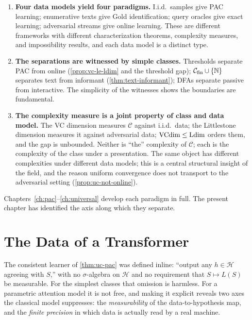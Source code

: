 \begin{enumerate}[leftmargin=*,itemsep=3pt]
\item \textbf{Four data models yield four paradigms.} I.i.d.\ samples give PAC learning; enumerative texts give Gold identification; query oracles give exact learning; adversarial streams give online learning. These are different frameworks with different characterization theorems, complexity measures, and impossibility results, and each data model is a distinct type.

\item \textbf{The separations are witnessed by simple classes.} Thresholds separate PAC from online (\cref{prop:vc-le-ldim} and the threshold gap); $\mathcal{C}_{\mathrm{fin}} \cup \{\mathbb{N}\}$ separates text from informant (\cref{thm:text-informant}); DFAs separate passive from interactive. The simplicity of the witnesses shows the boundaries are fundamental.

\item \textbf{The complexity measure is a joint property of class and data model.} The VC dimension measures $\mathcal{C}$ against i.i.d.\ data; the Littlestone dimension measures it against adversarial data; $\mathrm{VCdim} \leq \mathrm{Ldim}$ orders them, and the gap is unbounded. Neither is ``the'' complexity of $\mathcal{C}$; each is the complexity of the class under a presentation. The same object has different complexities under different data models; this is a central structural insight of the field, and the reason uniform convergence does not transport to the adversarial setting (\cref{prop:uc-not-online}).
\end{enumerate}

Chapters~\ref{ch:pac}--\ref{ch:universal} develop each paradigm in full. The present chapter has identified the axis along which they separate.


\section{The Data of a Transformer}
\label{sec:ch2-transformer}

The consistent learner of \cref{thm:uc-pac} was defined inline: ``output any $h \in \mathcal{H}$ agreeing with $S$,'' with no $\sigma$-algebra on $\mathcal{H}$ and no requirement that $S \mapsto L(S)$ be measurable. For the simplest classes that omission is harmless. For a parametric attention model it is not free, and making it explicit reveals two axes the classical model suppresses: the \emph{measurability} of the data-to-hypothesis map, and the \emph{finite precision} in which data is actually read by a real machine.

